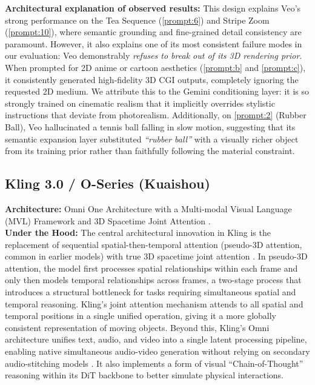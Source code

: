 \documentclass[sigconf]{acmart}
\begin{document}
\noindent\textbf{Architectural explanation of observed results:} This
design explains Veo's strong performance on the Tea Sequence
(\ref{prompt:6}) and Stripe Zoom (\ref{prompt:10}), where
semantic grounding and fine-grained detail consistency are paramount.
However, it also explains one of its most consistent failure modes in
our evaluation: Veo demonstrably \textit{refuses to break out of its
    3D rendering prior}. When prompted for 2D anime or cartoon aesthetics
(\ref{prompt:b} and \ref{prompt:c}), it consistently generated
high-fidelity 3D CGI outputs, completely
ignoring the requested 2D medium. We attribute this to the Gemini
conditioning layer: it is so strongly trained on cinematic realism that
it implicitly overrides stylistic instructions that deviate from
photorealism. Additionally, on \ref{prompt:2} (Rubber Ball), Veo
hallucinated a tennis ball falling in slow motion, suggesting that its
semantic expansion layer substituted \textit{``rubber ball''} with a
visually richer object from its training prior rather than faithfully
following the material constraint.

\subsection{Kling 3.0 / O-Series (Kuaishou)}
\textbf{Architecture:} Omni One Architecture with a Multi-modal Visual
Language (MVL) Framework and 3D Spacetime Joint Attention
\cite{kuaishou2025kling}. \\

\noindent\textbf{Under the Hood:} The central architectural innovation
in Kling is the replacement of sequential spatial-then-temporal attention
(pseudo-3D attention, common in earlier models) with true 3D spacetime
joint attention \cite{kuaishou2025kling}. In pseudo-3D attention, the
model first processes spatial relationships within each frame and only
then models temporal relationships across frames, a two-stage process
that introduces a structural bottleneck for tasks requiring simultaneous
spatial and temporal reasoning. Kling's joint attention mechanism attends
to all spatial and temporal positions in a single unified operation,
giving it a more globally consistent representation of moving objects.
Beyond this, Kling's Omni architecture unifies text, audio, and video
into a single latent processing pipeline, enabling native simultaneous
audio-video generation without relying on secondary audio-stitching models
\cite{kuaishou2025kling}. It also implements a form of visual
``Chain-of-Thought'' reasoning within its DiT backbone to better simulate
physical interactions.
\end{document}
